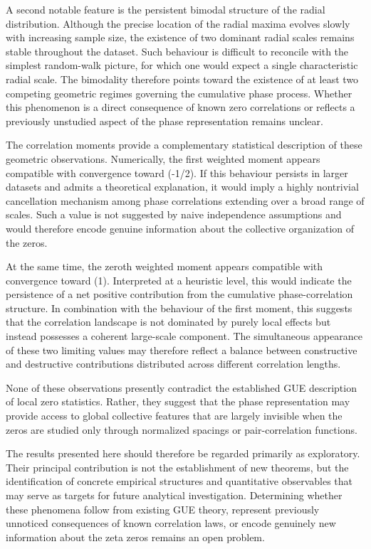 \documentclass[11pt]{amsart}
\theoremstyle{definition}
\theoremstyle{remark}
\begin{document}
A second notable feature is the persistent bimodal structure of the radial distribution. Although the precise location of the radial maxima evolves slowly with increasing sample size, the existence of two dominant radial scales remains stable throughout the dataset. Such behaviour is difficult to reconcile with the simplest random-walk picture, for which one would expect a single characteristic radial scale. The bimodality therefore points toward the existence of at least two competing geometric regimes governing the cumulative phase process. Whether this phenomenon is a direct consequence of known zero correlations or reflects a previously unstudied aspect of the phase representation remains unclear.

The correlation moments provide a complementary statistical description of these geometric observations. Numerically, the first weighted moment appears compatible with convergence toward (-1/2). If this behaviour persists in larger datasets and admits a theoretical explanation, it would imply a highly nontrivial cancellation mechanism among phase correlations extending over a broad range of scales. Such a value is not suggested by naive independence assumptions and would therefore encode genuine information about the collective organization of the zeros.

At the same time, the zeroth weighted moment appears compatible with convergence toward (1). Interpreted at a heuristic level, this would indicate the persistence of a net positive contribution from the cumulative phase-correlation structure. In combination with the behaviour of the first moment, this suggests that the correlation landscape is not dominated by purely local effects but instead possesses a coherent large-scale component. The simultaneous appearance of these two limiting values may therefore reflect a balance between constructive and destructive contributions distributed across different correlation lengths.

None of these observations presently contradict the established GUE description of local zero statistics. Rather, they suggest that the phase representation may provide access to global collective features that are largely invisible when the zeros are studied only through normalized spacings or pair-correlation functions.

The results presented here should therefore be regarded primarily as exploratory. Their principal contribution is not the establishment of new theorems, but the identification of concrete empirical structures and quantitative observables that may serve as targets for future analytical investigation. Determining whether these phenomena follow from existing GUE theory, represent previously unnoticed consequences of known correlation laws, or encode genuinely new information about the zeta zeros remains an open problem.
\end{document}
